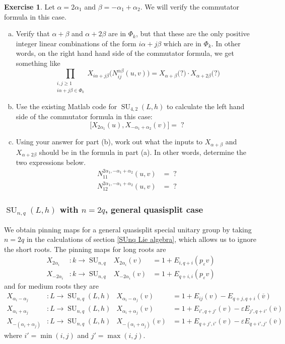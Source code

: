 \documentclass[12pt]{article}
\theoremstyle{definition}
\newtheorem{exercise}[theorem]{Exercise}
\numberwithin{theorem}{subsection}
\newcommand{\eps}{\varepsilon}
\newcommand{\ov}{\overline}
\DeclareMathOperator{\SU}{SU}
\begin{document}
\begin{exercise}
Let $\alpha = 2\alpha_1$ and $\beta = - \alpha_1 + \alpha_2$. We will verify the commutator formula in this case. 
\begin{enumerate}[(a)]
	\item Verify that $\alpha + \beta$ and $\alpha + 2\beta$ are in $\Phi_k$, but that these are the only positive integer linear combinations of the form $i\alpha + j\beta$ which are in $\Phi_k$. In other words, on the right hand hand side of the commutator formula, we get something like
	\[
		\prod_{\substack{{i,j \ge 1} \\ i\alpha+j\beta \in \Phi_k}} X_{i\alpha+j\beta} \Big( N_{ij}^{\alpha \beta}(u,v) \Big) = X_{\alpha+\beta} \Big( ? \Big) \cdot X_{\alpha + 2\beta} \Big( ?\Big)
	\]
	\item Use the existing Matlab code for $\SU_{4,2}(L,h)$ to calculate the left hand side of the commutator formula in this case:
	\[
		\Big[ X_{2\alpha_1}(u), X_{-\alpha_1 + \alpha_2}(v) \Big] = \; ?
	\]
	\item Using your answer for part (b), work out what the inputs to $X_{\alpha+\beta}$ and $X_{\alpha+2\beta}$ should be in the formula in part (a). In other words, determine the two expressions below.
	\begin{align*}
		N_{11}^{2\alpha_1, - \alpha_1 + \alpha_2}(u,v) &= \; ? \\
		N_{12}^{2\alpha_1, - \alpha_1 + \alpha_2}(u,v) &= \; ?
	\end{align*}
\end{enumerate}
\end{exercise}

\subsubsection{$\SU_{n,q}(L,h)$ with $n=2q$, general quasisplit case}
\label{SU2n pinning maximal}

We obtain pinning maps for a general quasisplit special unitary group by taking $n=2q$ in the calculations of section \ref{SUnq Lie algebra}, which allows us to ignore the short roots. The pinning maps for long roots are
\begin{align*}
	X_{2\alpha_i}&:k \to \SU_{n,q} & X_{2\alpha_i}(v) &= 1 + E_{i,q+i}(p_\eps v) \\
	X_{-2\alpha_i}&:k \to \SU_{n,q} & X_{-2\alpha_i}(v) &= 1 + E_{q+i,i}(p_\eps v)
\end{align*}
and for medium roots they are
\begin{align*}
	X_{\alpha_i - \alpha_j}&:L \to \SU_{n,q}(L,h) & X_{\alpha_i - \alpha_j}(v) &= 1 + E_{ij}(v) - E_{q+j,q+i}(\ov v) \\
	X_{\alpha_i + \alpha_j}&:L \to \SU_{n,q}(L,h) & X_{\alpha_i + \alpha_j}(v) &= 1 + E_{i',q+j'}(v) - \eps E_{j',q+i'}(\ov v) \\
	X_{-(\alpha_i + \alpha_j)}&:L \to \SU_{n,q}(L,h) & X_{-(\alpha_i + \alpha_j)}(v) &= 1 + E_{q+j',i'}(v) - \eps E_{q+i',j'}( \ov v)
\end{align*}
where $i' = \min(i,j)$ and $j' = \max(i,j)$. 
\end{document}
